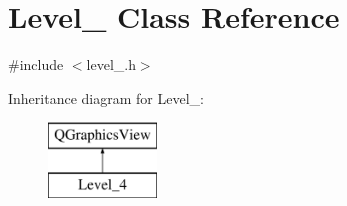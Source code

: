 \hypertarget{class_level__4}{}\section{Level\+\_ Class Reference}
\label{class_level__4}


{\ttfamily \#include $<$level\+\_.\+h$>$}

Inheritance diagram for Level\+\_\+:\begin{figure}[H]
\begin{center}
\leavevmode
\includegraphics[height=2.000000cm]{class_level__4}
\end{center}
\end{figure}
